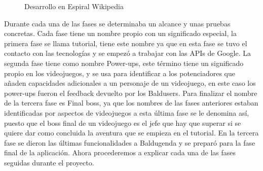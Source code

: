 \begin{figure}[H] 
  \begin{center} 
    \caption{Desarrollo en Espiral Wikipedia} 
    \label{fig:Espiral} 
  \end{center} 
\end{figure}

Durante cada una de las fases se determinaba un alcance y unas pruebas concretas.
Cada fase tiene un nombre propio con un significado especial, la primera fase se llama tutorial, tiene este nombre ya que en esta fase se tuvo el contacto con las tecnologías y se empezó a trabajar con las APIs de Google. La segunda fase tiene como nombre Power-ups, este término tiene un significado propio en los videojuegos,  y se usa para identificar a los potenciadores que añaden capacidades adicionales a un personaje de un  videojuego, en este caso los power-ups fueron el feedback devuelto por los Baldusers. Para finalizar el nombre de la tercera fase es  Final boss, ya que los nombres de las fases anteriores estaban identificadas por aspectos de videojuegos a esta última fase se le denomina así, puesto que el boss final de un videojuego es el jefe que hay que superar si se quiere dar como concluida la aventura que se empieza en el tutorial. En la tercera fase se dieron las últimas funcionalidades a Baldugenda y se preparó para la fase final de la aplicación.
Ahora procederemos a explicar cada una de las fases seguidas durante el proyecto.

